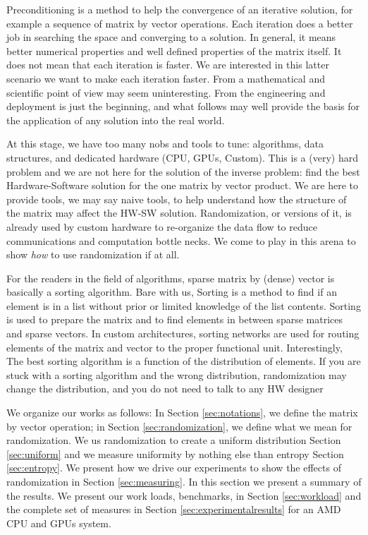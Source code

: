 \documentclass[manuscript,screen]{acmart}
\begin{document}
Preconditioning is a method to help the convergence of an iterative
solution, for example a sequence of matrix by vector operations.  Each
iteration does a better job in searching the space and converging to a
solution. In general, it means better numerical properties and well
defined properties of the matrix itself. It does not mean that each
iteration is faster. We are interested in this latter scenario we want
to make each iteration faster. From a mathematical and scientific
point of view may seem uninteresting. From the engineering and
deployment is just the beginning, and what follows may well provide
the basis for the application of any solution into the real world.

At this stage, we have too many nobs and tools to tune: algorithms,
data structures, and dedicated hardware (CPU, GPUs, Custom). This is a
(very) hard problem and we are not here for the solution of the
inverse problem: find the best Hardware-Software solution for the one
matrix by vector product. We are here to provide tools, we may say
naive tools, to help understand how the structure of the matrix may
affect the HW-SW solution. Randomization, or versions of it, is
already used by custom hardware to re-organize the data flow to reduce
communications and computation bottle necks. We come to play in this
arena to show {\em how} to use randomization if at all.

For the readers in the field of algorithms, sparse matrix by (dense)
vector is basically a sorting algorithm. Bare with us, Sorting is a
method to find if an element is in a list without prior or limited
knowledge of the list contents. Sorting is used to prepare the matrix
and to find elements in between sparse matrices and sparse vectors. In
custom architectures, sorting networks are used for routing elements
of the matrix and vector to the proper functional unit. Interestingly,
The best sorting algorithm is a function of the distribution of
elements. If you are stuck with a sorting algorithm and the wrong
distribution, randomization may change the distribution, and you do
not need to talk to any HW designer

We organize our works as follows: In Section \ref{sec:notations}, we
define the matrix by vector operation; in Section
\ref{sec:randomization}, we define what we mean for randomization. We
us randomization to create a uniform distribution Section
\ref{sec:uniform} and we measure uniformity by nothing else than
entropy Section \ref{sec:entropy}. We present how we drive our
experiments to show the effects of randomization in Section
\ref{sec:measuring}. In this section we present a summary of the
results. We present our work loads, benchmarks, in Section
\ref{sec:workload} and the complete set of measures in Section
\ref{sec:experimentalresults} for an AMD CPU and GPUs system.
\end{document}
